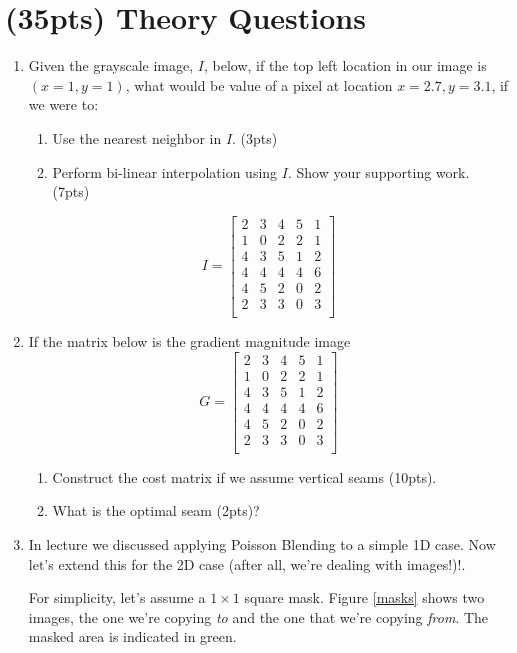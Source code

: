 \documentclass[12pt]{article}
\begin{document}
\section{(35pts) Theory Questions}
\begin{enumerate}
\item Given the grayscale image, $I$, below, if the top left location in our image is $(x=1,y=1)$, what would be value of a pixel at location $x=2.7, y=3.1$, if we were to:
	\begin{enumerate}
	\item Use the nearest neighbor in $I$. (3pts)
	\item Perform bi-linear interpolation using $I$.  Show your supporting work. (7pts)
	\end{enumerate}

$$
I=\begin{bmatrix}
2&	3&	4&	5&	1\\
1&	0&	2&	2&	1\\
4&	3&	5&	1&	2\\
4&	4&	4&	4&	6\\
4&	5&	2&	0&	2\\
2&	3&	3&	0&	3\\
\end{bmatrix}
$$	

\item If the matrix below is the gradient magnitude image
$$G =
\begin{bmatrix}
2&	3&	4&	5&	1\\
1&	0&	2&	2&	1\\
4&	3&	5&	1&	2\\
4&	4&	4&	4&	6\\
4&	5&	2&	0&	2\\
2&	3&	3&	0&	3\\
\end{bmatrix}
$$

\begin{enumerate}
\item Construct the cost matrix if we assume vertical seams (10pts).
\item What is the optimal seam (2pts)?
\end{enumerate}

\newpage
\item In lecture we discussed applying Poisson Blending to a simple 1D case.  Now let's extend this for the 2D case (after all, we're dealing with images!)!.

For simplicity, let's assume a $1\times1$ square mask.  Figure \ref{masks} shows two images, the one we're copying \emph{to} and the one that we're copying \emph{from}.  The masked area is indicated in green.


\end{enumerate}
\end{document}
